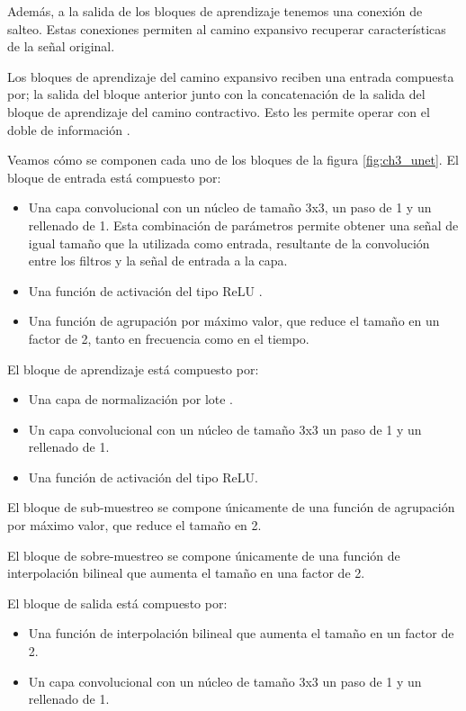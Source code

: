 Además, a la salida de los bloques de aprendizaje tenemos una conexión de salteo. Estas conexiones permiten al camino expansivo recuperar características de la señal original. 

Los bloques de aprendizaje del camino expansivo reciben una entrada compuesta por; la salida del bloque anterior junto con la concatenación de la salida del bloque de aprendizaje del camino contractivo. Esto les permite operar con el doble de información \cite{the_importance_of_skip_connections_in_biomedical_image_segmentation}.

Veamos cómo se componen cada uno de los bloques de la figura \ref{fig:ch3_unet}. El bloque de entrada está compuesto por:

\begin{itemize}
	\item Una capa convolucional con un núcleo de tamaño 3x3, un paso de 1 y un rellenado de 1. Esta combinación de parámetros permite obtener una señal de igual tamaño que la utilizada como entrada, resultante de la convolución entre los filtros y la señal de entrada a la capa.
	\item Una función de activación del tipo ReLU \cite{deep_learning}.
	\item Una función de agrupación por máximo valor, que reduce el tamaño en un factor de 2, tanto en frecuencia como en el tiempo.
\end{itemize}

El bloque de aprendizaje está compuesto por:

\begin{itemize}
	\item Una capa de normalización por lote \cite{deep_learning}.
	\item Un capa convolucional con un núcleo de tamaño 3x3 un paso de 1 y un rellenado de 1.
	\item Una función de activación del tipo ReLU.
\end{itemize}

El bloque de sub-muestreo se compone únicamente de una función de agrupación por máximo valor, que reduce el tamaño en 2.

El bloque de sobre-muestreo se compone únicamente de una función de interpolación bilineal que aumenta el tamaño en una factor de 2.

El bloque de salida está compuesto por:

\begin{itemize}
	\item Una función de interpolación bilineal que aumenta el tamaño en un factor de 2.
	\item Un capa convolucional con un núcleo de tamaño 3x3 un paso de 1 y un rellenado de 1.
\end{itemize}

